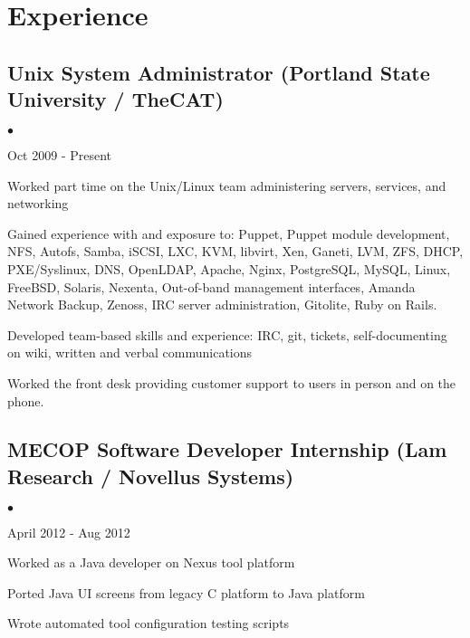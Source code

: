 \documentclass[10pt,letterpaper]{article}
\renewenvironment{itemize}{
  \begin{list}{}{
    \setlength{\leftmargin}{1.5em}
    \setlength{\itemsep}{0.25em}
    \setlength{\parskip}{0pt}
    \setlength{\parsep}{0.25em}
  }
}{
  \end{list}
}
\begin{document}
\renewenvironment{itemize}{
  \begin{list}{$\bullet$}{
    \setlength{\leftmargin}{1.5em}
    \setlength{\itemsep}{0.25em}
    \setlength{\parskip}{0pt}
    \setlength{\parsep}{0.25em}
  }
}{
  \end{list}
}
\section*{Experience}

\subsection*{Unix System Administrator (Portland State University / TheCAT)}
\begin{itemize}

    \item Oct 2009 - Present
    \item Worked part time on the Unix/Linux team administering servers, services, and networking
    \item Gained experience with and exposure to: Puppet, Puppet module development, NFS, Autofs, Samba, iSCSI, LXC, KVM, libvirt, Xen, Ganeti, LVM, ZFS, DHCP, PXE/Syslinux, DNS, OpenLDAP, Apache, Nginx, PostgreSQL, MySQL, Linux, FreeBSD, Solaris, Nexenta, Out-of-band management interfaces, Amanda Network Backup, Zenoss, IRC server administration, Gitolite, Ruby on Rails.
    \item Developed team-based skills and experience: IRC, git, tickets, self-documenting on wiki, written and verbal communications
    \item Worked the front desk providing customer support to users in person and on the phone.

 
\end{itemize}

\subsection*{MECOP Software Developer Internship (Lam Research / Novellus Systems)}
\begin{itemize}

    \item April 2012 - Aug 2012
    \item Worked as a Java developer on Nexus tool platform
    \item Ported Java UI screens from legacy C platform to Java platform
    \item Wrote automated tool configuration testing scripts

\end{itemize}
\end{document}
